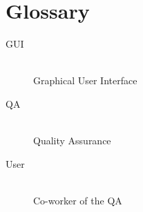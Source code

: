 \newpage
\section{Glossary}

\begin{description}
\item[GUI]\hfill \\ Graphical User Interface
\item[QA]\hfill \\ Quality Assurance
\item[User]\hfill \\ Co-worker of the QA
\end{description}